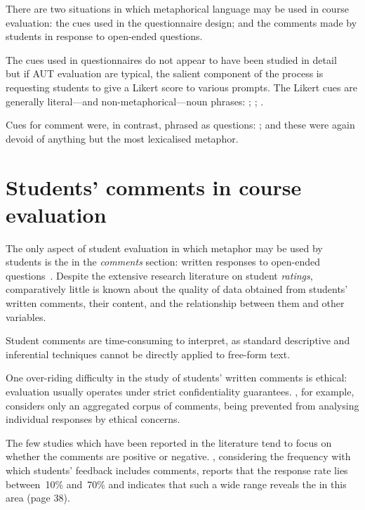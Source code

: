 There are two situations in which metaphorical language may be used in
course evaluation: the cues used in the questionnaire design; and the
comments made by students in response to open-ended questions.

The cues used in questionnaires do not appear to have been studied in
detail~\citep{aleamoni1980} but if AUT evaluation are typical, the
salient component of the process is requesting students to give a
Likert score to various prompts.  The Likert cues are generally
literal---and non-metaphorical---noun phrases: ; ; .

Cues for comment were, in contrast, phrased as questions: ;  and these were again devoid
of anything but the most lexicalised metaphor.

\section{Students' comments in course evaluation}

The only aspect of student evaluation in which metaphor may be used by
students is the in the \emph{comments} section: written responses to
open-ended questions~\citep{stewart2015}.  Despite the extensive
research literature on student \emph{ratings}, comparatively little is
known about the quality of data obtained from students' written
comments, their content, and the relationship between them and other
variables.

Student comments are time-consuming to interpret, as standard
descriptive and inferential techniques cannot be directly applied to
free-form text.

One over-riding difficulty in the study of students' written comments
is ethical: evaluation usually operates under strict confidentiality
guarantees.  , for example, considers only an
aggregated corpus of comments, being prevented from analysing
individual responses by ethical concerns.

The few studies which have been reported in the literature tend to
focus on whether the comments are positive or negative.
, considering the frequency with which students'
feedback includes comments, reports that the response rate lies
between~10\% and~70\% and indicates that such a wide range reveals the
 in this area (page 38).

